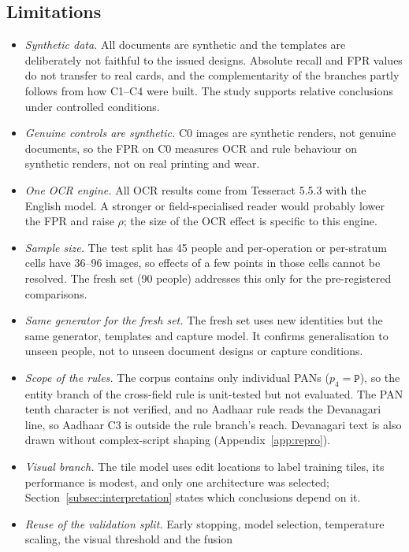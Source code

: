 \documentclass[conference]{IEEEtran}
\begin{document}
\subsection{Limitations}
\label{subsec:limitations}

\begin{itemize}
\item \emph{Synthetic data.} All documents are synthetic and the
templates are deliberately not faithful to the issued designs. Absolute
recall and FPR values do not transfer to real cards, and the
complementarity of the branches partly follows from how C1--C4 were
built. The study supports relative conclusions under controlled
conditions.
\item \emph{Genuine controls are synthetic.} C0 images are synthetic
renders, not genuine documents, so the FPR on C0 measures OCR and rule
behaviour on synthetic renders, not on real printing and wear.
\item \emph{One OCR engine.} All OCR results come from Tesseract 5.5.3
with the English model. A stronger or field-specialised reader would
probably lower the FPR and raise $\rho$; the size of the OCR effect is specific
to this engine.
\item \emph{Sample size.} The test split has 45 people and per-operation
or per-stratum cells have 36--96 images, so effects of a few points in
those cells cannot be resolved. The fresh set (90 people) addresses
this only for the pre-registered comparisons.
\item \emph{Same generator for the fresh set.} The fresh set uses new
identities but the same generator, templates and capture model. It
confirms generalisation to unseen people, not to unseen document
designs or capture conditions.
\item \emph{Scope of the rules.} The corpus contains only individual
PANs ($p_4=\texttt{P}$), so the entity branch of the cross-field rule is
unit-tested but not evaluated. The PAN tenth character is not verified, and no
Aadhaar rule reads the Devanagari line, so Aadhaar C3 is outside the
rule branch's reach. Devanagari text is also drawn without
complex-script shaping (Appendix~\ref{app:repro}).
\item \emph{Visual branch.} The tile model uses edit locations to label
training tiles, its performance is modest, and only one architecture was
selected; Section~\ref{subsec:interpretation} states which conclusions
depend on it.
\item \emph{Reuse of the validation split.} Early stopping, model
selection, temperature scaling, the visual threshold and the fusion

\end{itemize}
\end{document}

